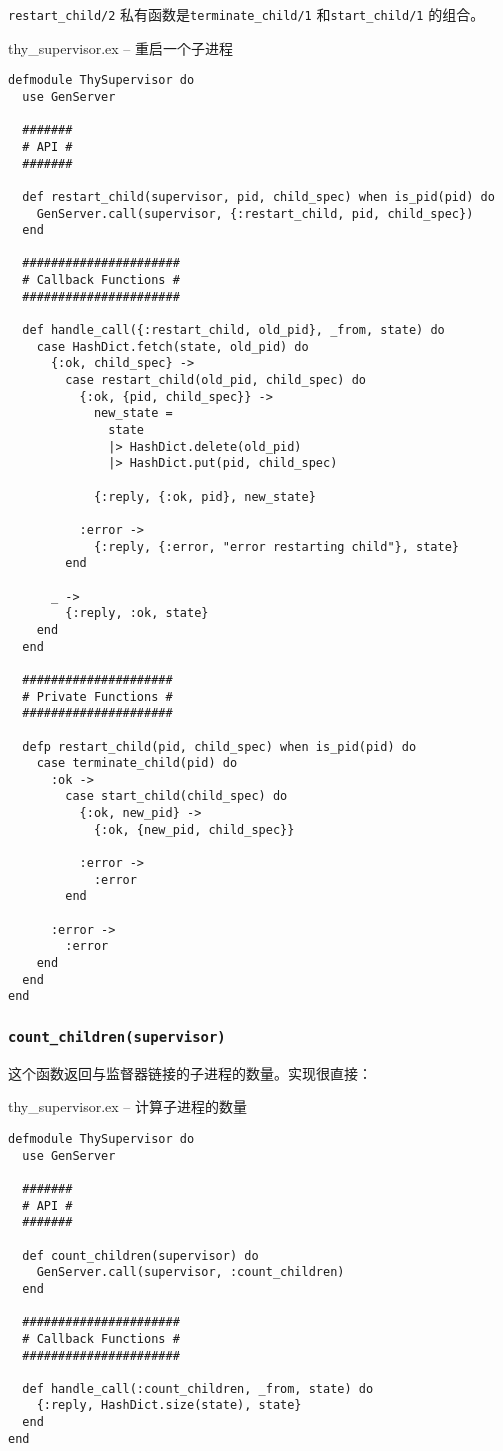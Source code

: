 \texttt{restart\_child/2} 私有函数是\texttt{terminate\_child/1} 和\texttt{start\_child/1} 的组合。

\begin{code}{thy\_supervisor.ex -- 重启一个子进程}
\begin{verbatim}
defmodule ThySupervisor do
  use GenServer

  #######
  # API #
  #######

  def restart_child(supervisor, pid, child_spec) when is_pid(pid) do
    GenServer.call(supervisor, {:restart_child, pid, child_spec})
  end

  ######################
  # Callback Functions #
  ######################

  def handle_call({:restart_child, old_pid}, _from, state) do
    case HashDict.fetch(state, old_pid) do
      {:ok, child_spec} ->
        case restart_child(old_pid, child_spec) do
          {:ok, {pid, child_spec}} ->
            new_state =
              state
              |> HashDict.delete(old_pid)
              |> HashDict.put(pid, child_spec)

            {:reply, {:ok, pid}, new_state}

          :error ->
            {:reply, {:error, "error restarting child"}, state}
        end

      _ ->
        {:reply, :ok, state}
    end
  end

  #####################
  # Private Functions #
  #####################

  defp restart_child(pid, child_spec) when is_pid(pid) do
    case terminate_child(pid) do
      :ok ->
        case start_child(child_spec) do
          {:ok, new_pid} ->
            {:ok, {new_pid, child_spec}}

          :error ->
            :error
        end

      :error ->
        :error
    end
  end
end
\end{verbatim}
\label{lst:restart_single_child}
\end{code}

\subsubsection{\texttt{count\_children(supervisor)}}

这个函数返回与监督器链接的子进程的数量。实现很直接：

\begin{code}{thy\_supervisor.ex -- 计算子进程的数量}
\begin{verbatim}
defmodule ThySupervisor do
  use GenServer

  #######
  # API #
  #######

  def count_children(supervisor) do
    GenServer.call(supervisor, :count_children)
  end

  ######################
  # Callback Functions #
  ######################

  def handle_call(:count_children, _from, state) do
    {:reply, HashDict.size(state), state}
  end
end
\end{verbatim}
\label{lst:count_children}
\end{code}

